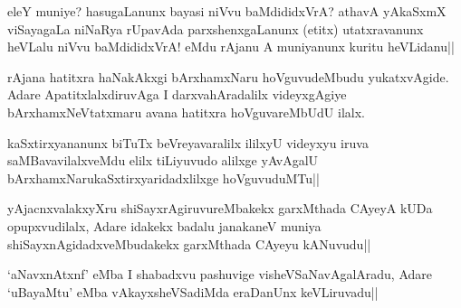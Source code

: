 
\begin{artha}
eleY muniye? hasugaLanunx bayasi niVvu baMdididxVrA? athavA yAkaSxmX viSayagaLa niNaRya rUpavAda parxshenxgaLanunx (etitx) utatxravanunx heVLalu niVvu baMdididxVrA! eMdu rAjanu A muniyanunx kuritu heVLidanu||
\end{artha}


\begin{artha}
rAjana hatitxra haNakAkxgi bArxhamxNaru hoVguvudeMbudu yukatxvAgide. Adare ApatitxlalxdiruvAga I darxvahAradalilx videyxgAgiye bArxhamxNeVtatxmaru avana hatitxra hoVguvareMbUdU ilalx.
\end{artha}

\begin{artha}
kaSxtirxyananunx biTuTx beVreyavaralilx ililxyU videyxyu iruva saMBavavilalxveMdu elilx tiLiyuvudo alilxge yAvAgalU bArxhamxNarukaSxtirxyaridadxlilxge hoVguvuduMTu||
\end{artha}


\begin{artha}
yAjacnxvalakxyXru shiSayxrAgiruvureMbakekx garxMthada CAyeyA kUDa opupxvudilalx, Adare idakekx badalu janakaneV muniya shiSayxnAgidadxveMbudakekx garxMthada CAyeyu kANuvudu||
\end{artha}


\begin{artha}
`aNavxnAtxnf' eMba I shabadxvu pashuvige visheVSaNavAgalAradu, Adare `uBayaMtu' eMba vAkayxsheVSadiMda eraDanUnx keVLiruvadu||
\end{artha}

\stext
